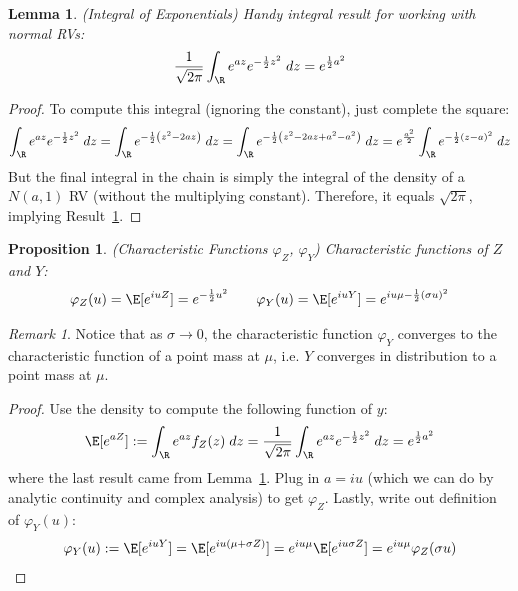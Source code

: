\documentclass[12pt]{article}
\theoremstyle{plain}
\newtheorem{lem}[thm]{Lemma}
\newtheorem{prop}[thm]{Proposition}
\theoremstyle{definition}
\theoremstyle{remark}
\newtheorem*{rmk}{Remark}
\newcommand{\ra}{\rightarrow}
\begin{document}
\begin{lem}\emph{(Integral of Exponentials)}
\label{lem:normintegral}
Handy integral result for working with normal RVs:
\begin{align}
  \frac{1}{\sqrt{2\pi}}
  \int_\R e^{az} e^{-\frac{1}{2}z^2}\; dz
  =
  e^{\frac{1}{2}a^2}
\end{align}
\end{lem}
\begin{proof}
To compute this integral (ignoring the constant), just complete the
square:
\begin{align*}
  \int_\R e^{az} e^{-\frac{1}{2}z^2}\; dz
  =
  \int_\R e^{-\frac{1}{2}\left(z^2-2az\right)}\; dz
  =
  \int_\R e^{-\frac{1}{2}\left(z^2-2az+a^2-a^2\right)}\; dz
  =
  e^{\frac{a^2}{2}}
  \int_\R e^{-\frac{1}{2}\left(z-a\right)^2}\; dz
\end{align*}
But the final integral in the chain is simply the integral of the
density of a $N(a,1)$ RV (without the multiplying constant).
Therefore, it equals $\sqrt{2\pi}$, implying
Result~\ref{lem:normintegral}.
\end{proof}

\begin{prop}\emph{(Characteristic Functions $\varphi_Z$, $\varphi_Y$)}
Characteristic functions of $Z$ and $Y$:
\begin{align*}
  \varphi_Z(u)
  = \E[e^{iuZ}]
  = e^{-\frac{1}{2}u^2}
  \qquad
  \varphi_Y(u)
  = \E[e^{iuY}]
  = e^{iu\mu-\frac{1}{2}(\sigma u)^2}
\end{align*}
\end{prop}
\begin{rmk}
Notice that as $\sigma\ra 0$, the characteristic function $\varphi_Y$
converges to the characteristic function of a point mass at $\mu$, i.e.
$Y$ converges in distribution to a point mass at $\mu$.
\end{rmk}
\begin{proof}
Use the density to compute the following function of $y$:
\begin{align*}
  \E[e^{aZ}]
  := \int_\R e^{az} f_Z(z) \; dz
  =
  \frac{1}{\sqrt{2\pi}}
  \int_\R e^{az} e^{-\frac{1}{2}z^2} \; dz
  = e^{\frac{1}{2}a^2}
\end{align*}
where the last result came from Lemma~\ref{lem:normintegral}.
Plug in $a=iu$ (which we can do by analytic continuity and complex
analysis) to get $\varphi_Z$.
Lastly, write out definition of $\varphi_Y(u)$:
\begin{align*}
  \varphi_Y(u)
  := \E[e^{iuY}]
  = \E[e^{iu(\mu+\sigma Z)}]
  = e^{iu\mu}\E[e^{iu\sigma Z}]
  = e^{iu\mu}\varphi_Z(\sigma u)
\end{align*}
\end{proof}
\end{document}

